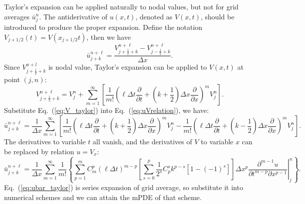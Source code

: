 \documentclass[]{article}
\def\jph{{j+\frac{1}{2}}}
\def\jmh{{j-\frac{1}{2}}}
\begin{document}
Taylor's expansion can be applied naturally to nodal values, but not for
grid averages $\bar u_j^n$. The antiderivative of $u(x,t)$, 
denoted as $V(x,t)$,
should be introduced to produce the proper expansion. Define the notation
$V_{j+1/2}(t)=V(x_{j+1/2}t)$, then we have
\begin{equation}
\bar u_{j+k}^{n+\ell}=
\frac{V_{\jph+k}^{n+\ell}-V_{\jmh+k}^{n+\ell}}{\Delta x}.
\label{eq:uVrelation}
\end{equation}
Since $V_{\jph+k}^{n+l}$ is nodal value, Taylor's expansion can be
applied to $V(x,t)$ at point $(j,n)$:
\begin{equation}
V_{\jph+k}^{n+\ell} = V_{j}^n + \sum_{m=1}^{\infty}
\left[ 
\frac{1}{m!} 
\left(
\ell\Delta t \frac{\partial}{\partial t} + 
\left(k+\frac{1}{2}\right) \Delta x\frac{\partial}{\partial x}
\right)^m V_j^n
\right].
\label{eq:V_taylor}
\end{equation}
Substitute Eq.~(\ref{eq:V_taylor}) into Eq.~(\ref{eq:uVrelation}), we
have:
\begin{equation}
\bar u_{j+k}^{n+\ell} = \frac{1}{\Delta x} \sum_{m=1}^{\infty} 
\left[
\frac{1}{m!}\left( \ell\Delta t\frac{\partial}{\partial t} +
\left(k+\frac{1}{2}\right)\Delta x\frac{\partial}{\partial x}\right)^m 
V_j^n -
\frac{1}{m!}\left(\ell\Delta t\frac{\partial}{\partial t} +
\left(k-\frac{1}{2}\right)\Delta x\frac{\partial}{\partial x}\right)^m 
V_j^n
\right].
\label{eq:uVrelation2}
\end{equation}
The derivatives to variable $t$ all vanish, and the derivatives of $V$ to
variable $x$ can be replaced by relation $u=V_x$:
\begin{equation}
\bar u_{j+k}^{n+\ell} = \frac{1}{\Delta x} \sum_{m=1}^{\infty}\frac{1}{m!}
\left\{
\sum_{p=1}^m C_m^p(\ell\Delta t)^{m-p} 
\left[
\sum_{s=0}^p \frac{1}{2^s}C_p^s k^{p-s}\left[1-(-1)^s\right]
\right]
\Delta x^p 
\left. 
\frac{\partial ^{m-1}u}{\partial t^{m-p}\partial x^{p-1}}
\right|_j^n
\right\}.
\label{eq:ubar_taylor}
\end{equation}
Eq.~(\ref{eq:ubar_taylor}) is series expansion of
grid average, so substitute it into numerical schemes and we can
attain the mPDE of that scheme.
\end{document}

